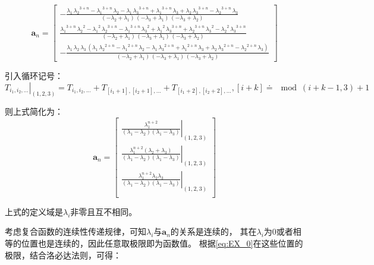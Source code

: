 \documentclass[UTF8,zihao=5]{ctexart}
\newcommand{\bm}[1]{{\mathbf{#1}}}
\begin{document}
\begin{equation}
    \bm{a}_n=
    \left[\begin{array}{c} -\frac{\lambda _{1}\,{\lambda _{2}}^{3+n}-{\lambda _{1}}^{3+n}\,\lambda _{2}-\lambda _{1}\,{\lambda _{3}}^{3+n}+{\lambda _{1}}^{3+n}\,\lambda _{3}+\lambda _{2}\,{\lambda _{3}}^{3+n}-{\lambda _{2}}^{3+n}\,\lambda _{3}}{\left(-\lambda _{2}+\lambda _{1}\right)\,\left(-\lambda _{3}+\lambda _{1}\right)\,\left(-\lambda _{3}+\lambda _{2}\right)}\\ \frac{{\lambda _{1}}^{3+n}\,{\lambda _{2}}^2-{\lambda _{1}}^2\,{\lambda _{2}}^{3+n}-{\lambda _{1}}^{3+n}\,{\lambda _{3}}^2+{\lambda _{1}}^2\,{\lambda _{3}}^{3+n}+{\lambda _{2}}^{3+n}\,{\lambda _{3}}^2-{\lambda _{2}}^2\,{\lambda _{3}}^{3+n}}{\left(-\lambda _{2}+\lambda _{1}\right)\,\left(-\lambda _{3}+\lambda _{1}\right)\,\left(-\lambda _{3}+\lambda _{2}\right)}\\ -\frac{\lambda _{1}\,\lambda _{2}\,\lambda _{3}\,\left(\lambda _{1}\,{\lambda _{2}}^{2+n}-{\lambda _{1}}^{2+n}\,\lambda _{2}-\lambda _{1}\,{\lambda _{3}}^{2+n}+{\lambda _{1}}^{2+n}\,\lambda _{3}+\lambda _{2}\,{\lambda _{3}}^{2+n}-{\lambda _{2}}^{2+n}\,\lambda _{3}\right)}{\left(-\lambda _{2}+\lambda _{1}\right)\,\left(-\lambda _{3}+\lambda _{1}\right)\,\left(-\lambda _{3}+\lambda _{2}\right)} \end{array}\right]
\end{equation}

引入循环记号：$\left.T_{i_1,i_2,...}\right|_{(1,2,3)}=T_{i_1,i_2,...}+T_{[i_1+1],[i_2+1],...}+T_{[i_1+2],[i_2+2],...}, [i+k]\doteq\mod{(i+k-1,3)}+1$

则上式简化为：
\begin{equation}
    \bm{a}_n=\begin{bmatrix}
        \left.\frac{\lambda_1^{n+2}}{(\lambda_1-\lambda_2)(\lambda_1-\lambda_3)}\right|_{(1,2,3)}\\
        \left.\frac{\lambda_1^{n+2}(\lambda_2+\lambda_3)}{(\lambda_1-\lambda_2)(\lambda_1-\lambda_3)}\right|_{(1,2,3)}\\
        \left.\frac{\lambda_1^{n+2}\lambda_2\lambda_3}{(\lambda_1-\lambda_2)(\lambda_1-\lambda_3)}\right|_{(1,2,3)}\\
    \end{bmatrix}
    \label{eq:EX_0}
\end{equation}

上式的定义域是$\lambda_i$非零且互不相同。


考虑复合函数的连续性传递规律，可知$\lambda_i$与$\bm{a}_n$的关系是连续的，
其在$\lambda_i$为0或者相等的位置也是连续的，因此任意取极限即为函数值。
根据\eqref{eq:EX_0}在这些位置的极限，结合洛必达法则，可得：
\end{document}
